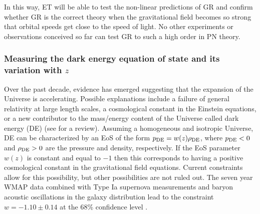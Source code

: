 In this way, ET will be able to test the non-linear predictions of GR
and confirm whether GR is the correct theory when the gravitational field
becomes so strong that orbital speeds get close to the speed of light.
No other experiments or observations conceived so far can test GR to
such a high order in PN theory.




\subsubsection{Measuring the dark energy equation of state
and its variation with $z$}

Over the past decade, evidence has emerged suggesting that the expansion of the Universe is accelerating. Possible explanations include a failure of general relativity at large length scales, a cosmological constant in the Einstein equations, or a new contributor to the mass/energy content of the Universe called dark energy (DE) (see \cite{PeeblesRatra03} for a review). Assuming a homogeneous and isotropic Universe, DE can be characterized by an EoS of the form $p_{\rm DE} = w(z) \rho_{\rm DE}$, where $p_{\rm DE} < 0$ and $\rho_{\rm DE} > 0$ are the pressure and density, respectively. If the EoS parameter $w(z)$ is constant and equal to $-1$ then this corresponds to having a positive cosmological constant in the gravitational field equations. Current constraints allow for this possibility, but other possibilities are not ruled out. The seven year WMAP data combined with Type Ia supernova measurements and baryon acoustic oscillations in the galaxy distribution lead to the constraint $w = -1.10 \pm 0.14$ at the 68\% confidence level \cite{WMAP7}.

